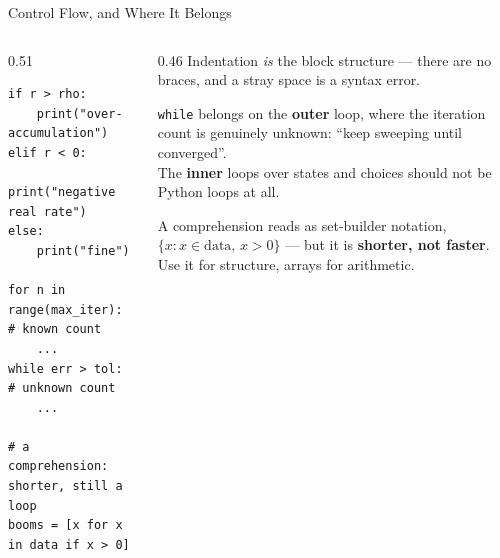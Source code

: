 \begin{frame}[fragile]{Control Flow, and Where It Belongs}
\begin{columns}[T]
\begin{column}{0.51\textwidth}
\begin{lstlisting}
if r > rho:
    print("over-accumulation")
elif r < 0:
    print("negative real rate")
else:
    print("fine")

for n in range(max_iter):     # known count
    ...
while err > tol:              # unknown count
    ...

# a comprehension: shorter, still a loop
booms = [x for x in data if x > 0]
\end{lstlisting}
\end{column}
\begin{column}{0.46\textwidth}
\small
Indentation \emph{is} the block structure --- there are no braces, and a stray space is a syntax error.
\medskip
\begin{takeawaybox}[title=\textbf{The rule for this course}]\footnotesize
\texttt{while} belongs on the \textbf{outer} loop, where the iteration count is genuinely unknown: ``keep sweeping until converged''.\\[1mm]
The \textbf{inner} loops over states and choices should not be Python loops at all.
\end{takeawaybox}
\medskip
\begin{cautionbox}\footnotesize
A comprehension reads as set-builder notation, $\{x : x\in\text{data},\,x>0\}$ --- but it is \textbf{shorter, not faster}. Use it for structure, arrays for arithmetic.
\end{cautionbox}
\end{column}
\end{columns}
\vspace{1mm}
\end{frame}

